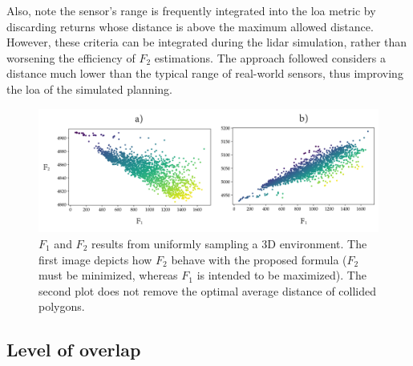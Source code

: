 Also, note the sensor's range is frequently integrated into the \acrshort{loa} metric by discarding returns whose distance is above the maximum allowed distance. However, these criteria can be integrated during the \acrshort{lidar} simulation, rather than worsening the efficiency of $F_2$ estimations. The approach followed considers a distance much lower than the typical range of real-world sensors, thus improving the \acrshort{loa} of the simulated planning.

\begin{figure}
    \centering
    \includegraphics[width=\linewidth]{figs/lidar_optimization/f2_sampling.png}
	\caption{$F_1$ and $F_2$ results from uniformly sampling a 3D environment. The first image depicts how $F_2$ behave with the proposed formula ($F_2$ must be minimized, whereas $F_1$ is intended to be maximized). The second plot does not remove the optimal average distance of collided polygons.}
	\label{fig:f2_sampling}
\end{figure}

\subsection{Level of overlap}

